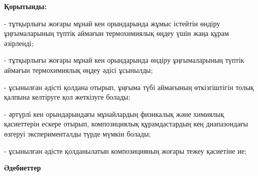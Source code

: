 \begin{multicols}{2}
{\bfseries Қорытынды:}

- тұтқырлығы жоғары мұнай кен орындарында жұмыс істейтін өндіру
ұңғымаларының түптік аймағын термохимиялық өңдеу үшін жаңа құрам
әзірленді;

- тұтқырлығы жоғары мұнай кен орындарында өндіру ұңғымаларының түптік
аймағын термохимиялық өңдеу әдісі ұсынылды;

- ұсынылған әдісті қолдана отырып, ұңғыма түбі аймағының өткізгіштігін
толық қалпына келтіруге қол жеткізуге болады;

- әртүрлі кен орындарындағы мұнайлардың физикалық және химиялық
қасиеттерін ескере отырып, композициялық құрамдастардың кең диапазондағы
өзгеруі эксперименталды түрде мүмкін болады;

- ұсынылған әдісте қолданылатын композицияның жоғары тежеу қасиетіне ие;
\end{multicols}

\begin{center}
{\bfseries Әдебиеттер}
\end{center}

